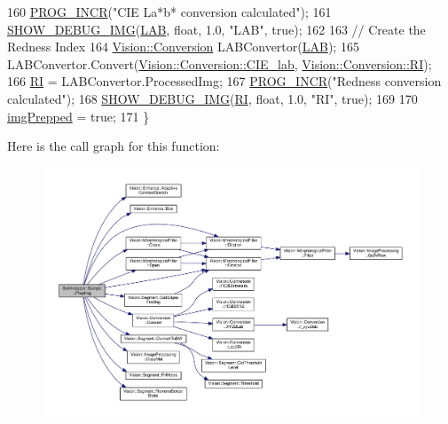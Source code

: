 \begin{DoxyCode}
160   \hyperlink{_sample_8h_a46c89e6320d3c886c2726161399fed91}{PROG\_INCR}(\textcolor{stringliteral}{"CIE La*b* conversion calculated"});
161   \hyperlink{_vision_debug_8h_aae864fa4f990213a4184a209ff236202}{SHOW\_DEBUG\_IMG}(\hyperlink{class_soil_analyzer_1_1_soil_a59ee773ff73380a12b1c2af3b86f6638}{LAB}, \textcolor{keywordtype}{float}, 1.0, \textcolor{stringliteral}{"LAB"}, \textcolor{keyword}{true});
162 
163   \textcolor{comment}{// Create the Redness Index}
164   \hyperlink{class_vision_1_1_conversion}{Vision::Conversion} LABConvertor(\hyperlink{class_soil_analyzer_1_1_soil_a59ee773ff73380a12b1c2af3b86f6638}{LAB});
165   LABConvertor.Convert(\hyperlink{class_vision_1_1_conversion_a0a21d4ccbb013185f1974d35ec86e388afd9ec9933d500e5eeec6ce3359321b0e}{Vision::Conversion::CIE\_lab}, 
      \hyperlink{class_vision_1_1_conversion_a0a21d4ccbb013185f1974d35ec86e388addf2a4063c4fe27e2675fafccdcdd9c1}{Vision::Conversion::RI});
166   \hyperlink{class_soil_analyzer_1_1_soil_abe8693b60a3d88433ffb8255b8d260c3}{RI} = LABConvertor.ProcessedImg;
167   \hyperlink{_sample_8h_a46c89e6320d3c886c2726161399fed91}{PROG\_INCR}(\textcolor{stringliteral}{"Redness conversion calculated"});
168   \hyperlink{_vision_debug_8h_aae864fa4f990213a4184a209ff236202}{SHOW\_DEBUG\_IMG}(\hyperlink{class_soil_analyzer_1_1_soil_abe8693b60a3d88433ffb8255b8d260c3}{RI}, \textcolor{keywordtype}{float}, 1.0, \textcolor{stringliteral}{"RI"}, \textcolor{keyword}{true});
169 
170   \hyperlink{class_soil_analyzer_1_1_sample_ab025a26f7276128a5a974cae15b51dfc}{imgPrepped} = \textcolor{keyword}{true};
171 \}
\end{DoxyCode}


Here is the call graph for this function\+:\nopagebreak
\begin{figure}[H]
\begin{center}
\leavevmode
\includegraphics[width=350pt]{class_soil_analyzer_1_1_sample_a23050a1fff3e11e907657623756333b2_cgraph}
\end{center}
\end{figure}




